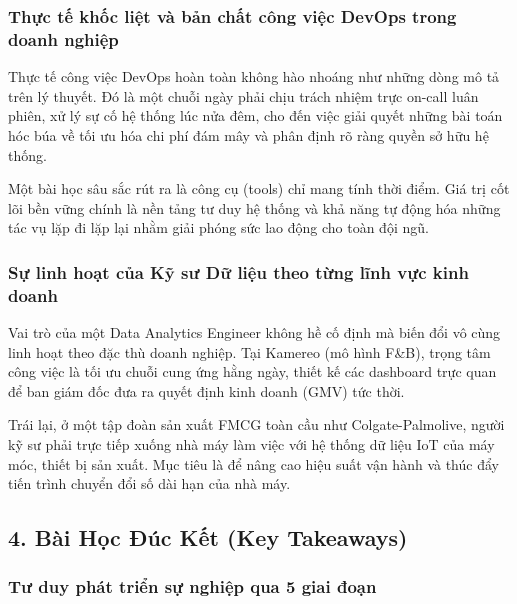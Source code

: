 \hypertarget{thux1ef1c-tux1ebf-khux1ed1c-liux1ec7t-vuxe0-bux1ea3n-chux1ea5t-cuxf4ng-viux1ec7c-devops-trong-doanh-nghiux1ec7p}{%
\subsubsection{Thực tế khốc liệt và bản chất công việc DevOps trong
doanh
nghiệp}}

Thực tế công việc DevOps hoàn toàn không hào nhoáng như những dòng mô tả
trên lý thuyết. Đó là một chuỗi ngày phải chịu trách nhiệm trực on-call
luân phiên, xử lý sự cố hệ thống lúc nửa đêm, cho đến việc giải quyết
những bài toán hóc búa về tối ưu hóa chi phí đám mây và phân định rõ
ràng quyền sở hữu hệ thống.

Một bài học sâu sắc rút ra là công cụ (tools) chỉ mang tính thời điểm.
Giá trị cốt lõi bền vững chính là nền tảng tư duy hệ thống và khả năng
tự động hóa những tác vụ lặp đi lặp lại nhằm giải phóng sức lao động cho
toàn đội ngũ.

\hypertarget{sux1ef1-linh-houx1ea1t-cux1ee7a-kux1ef9-sux1b0-dux1eef-liux1ec7u-theo-tux1eebng-lux129nh-vux1ef1c-kinh-doanh}{%
\subsubsection{Sự linh hoạt của Kỹ sư Dữ liệu theo từng lĩnh vực kinh
doanh}}

Vai trò của một Data Analytics Engineer không hề cố định mà biến đổi vô
cùng linh hoạt theo đặc thù doanh nghiệp. Tại Kamereo (mô hình F\&B),
trọng tâm công việc là tối ưu chuỗi cung ứng hằng ngày, thiết kế các
dashboard trực quan để ban giám đốc đưa ra quyết định kinh doanh (GMV)
tức thời.

Trái lại, ở một tập đoàn sản xuất FMCG toàn cầu như Colgate-Palmolive,
người kỹ sư phải trực tiếp xuống nhà máy làm việc với hệ thống dữ liệu
IoT của máy móc, thiết bị sản xuất. Mục tiêu là để nâng cao hiệu suất
vận hành và thúc đẩy tiến trình chuyển đổi số dài hạn của nhà máy.

\hypertarget{buxe0i-hux1ecdc-ux111uxfac-kux1ebft-key-takeaways}{%
\subsection{4. Bài Học Đúc Kết (Key
Takeaways)}}

\hypertarget{tux1b0-duy-phuxe1t-triux1ec3n-sux1ef1-nghiux1ec7p-qua-5-giai-ux111oux1ea1n}{%
\subsubsection{Tư duy phát triển sự nghiệp qua 5 giai
đoạn}}

